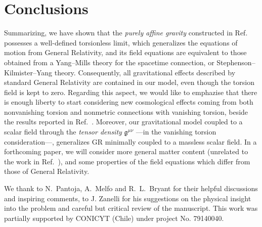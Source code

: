 \documentclass[aps,prd,12pt,twocolumn,superscriptaddress,showpacs,showkeys,reprint%
]{revtex4-1}
\renewcommand{\(}{\left(}
\renewcommand{\)}{\right)}
\renewcommand{\[}{\left[}
\renewcommand{\]}{\right]}
\begin{document}
\section{\label{conclusions}Conclusions}

Summarizing, we have shown that the  \emph{purely affine gravity} constructed in Ref.~\cite{Skirzewski:2014eta} possesses a well-defined torsionless limit, which generalizes the equations of motion  from General Relativity, and its field equations are equivalent to those obtained from a Yang--Mills theory for the spacetime connection, or Stephenson--Kilmister--Yang theory. Consequently, all gravitational effects described by standard General Relativity are contained in our model, even though the torsion field is kept to zero. Regarding this aspect, we would like to emphazise that there is enough liberty to start considering new cosmological effects coming from both nonvanishing torsion and nonmetric connections with vanishing torsion, beside the results reported in Ref.~\cite{Chen:2013kia,Chen:2013ota}.
Moreover, our gravitational model coupled to a scalar field through the \emph{tensor density} $\mathfrak{g}^{\mu\nu}$ ---in the vanishing torsion consideration---, generalizes GR minimally coupled to a massless scalar field. In a forthcoming paper, we will consider more general matter content (unrelated to the work in Ref.~\cite{Cook:2008mx}), and some properties of the field equations which differ from those of General Relativity.

\begin{acknowledgments}
  We thank to N.~Pantoja, A.~Melfo and R.~L.~Bryant for their helpful discussions and inspiring comments, to J. Zanelli for his suggestions on the physical insight into the problem and careful but critical review of the manuscript.
  This work was partially supported by CONICYT (Chile) under project No. 79140040.
\end{acknowledgments}

\appendix





\end{document}
